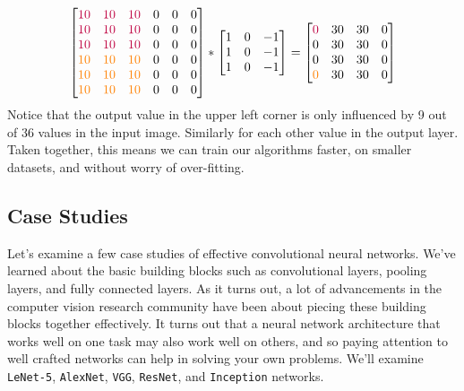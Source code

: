 \documentclass[12pt]{article}
\begin{document}
\begin{equation*}   \begin{bmatrix}
 \color{purple} 10 & \color{purple} 10 & \color{purple} 10 & 0 & 0 & 0 \\
 \color{purple} 10 & \color{purple} 10 & \color{purple} 10 & 0 & 0 & 0 \\
 \color{purple} 10 & \color{purple} 10 & \color{purple} 10 & 0 & 0 & 0 \\
 \color{orange} 10 & \color{orange} 10 & \color{orange} 10 & 0 & 0 & 0 \\
 \color{orange} 10 & \color{orange} 10 & \color{orange} 10 & 0 & 0 & 0 \\
 \color{orange} 10 & \color{orange} 10 & \color{orange} 10 & 0 & 0 & 0
  \end{bmatrix} 
  * 
  \begin{bmatrix}     
    1 & 0 & -1 \\     
    1 & 0 & -1 \\
    1 & 0 & -1 \\
  \end{bmatrix}
  =
  \begin{bmatrix}     
    \color{purple} 0 & 30 & 30 & 0 \\
    0 & 30 & 30 & 0 \\
    0 & 30 & 30 & 0 \\
    \color{orange} 0 & 30 & 30 & 0 \\
  \end{bmatrix} 
\end{equation*}
 Notice that the output value in the upper left corner is only influenced by 9 out of 36 values in the input image. Similarly for
each other value in the output layer.
Taken together, this means we can train our algorithms faster, on smaller datasets, and without worry of over-fitting.

\subsection{Case Studies} Let's examine a few case studies of effective convolutional neural networks. We've learned about
the basic building blocks such as convolutional layers, pooling layers, and fully connected layers. As it turns out,
a lot of advancements in the computer vision research community have been about piecing these building blocks together effectively.
It turns out that a neural network architecture that works well on one task may also work well on others, and so
paying attention to well crafted networks can help in solving your own problems. We'll examine \texttt{LeNet-5}, \texttt{AlexNet},
\texttt{VGG}, \texttt{ResNet}, and \texttt{Inception} networks.
\end{document}
